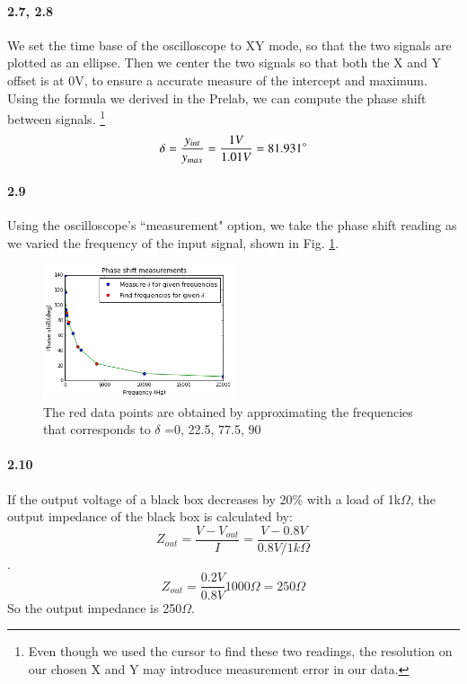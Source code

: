 \documentclass[authoryear, 12pt,5p, times]{elsarticle}
\begin{document}
\paragraph{\textbf{2.7, 2.8}}
We set the time base of the oscilloscope to XY mode, so that the two signals are plotted as an ellipse. Then we center the two signals so that both the X and Y offset is at 0V, to ensure a accurate measure of the intercept and maximum. Using the formula we derived in the Prelab, we can compute the phase shift between signals. \footnote{Even though we used the cursor to find these two readings, the resolution on our chosen X and Y may introduce measurement error in our data.}
\begin{equation}
\delta = \frac{y_{int}}{y_{max}}=\frac{1V}{1.01V}=81.931 \degree
\end{equation}
\paragraph{\textbf{2.9}}
Using the oscilloscope's ``measurement" option, we take the phase shift reading as we varied the frequency of the input signal, shown in Fig. \ref{phase_plot}.
\begin{figure}[h!]
\includegraphics[width=0.5\textwidth]{figure/phase_plot}
\caption{The red data points are obtained by approximating the frequencies that corresponds to $\delta $ =0\degree, 22.5\degree, 77.5\degree, 90\degree  }
\label{phase_plot}
\end{figure}
\paragraph{\textbf{2.10}}
If the output voltage of a black box decreases by 20\% with a load of 1k$\Omega$, the output impedance of the black box is calculated by:
$$Z_{out} = \frac{V-V_{out}}{I} =\frac{V-0.8V}{0.8V/1k\Omega} $$. 
$$Z_{out} = \frac{0.2V}{0.8V}1000\Omega=250\Omega$$
So the output impedance is 250$\Omega$.
\end{document}
